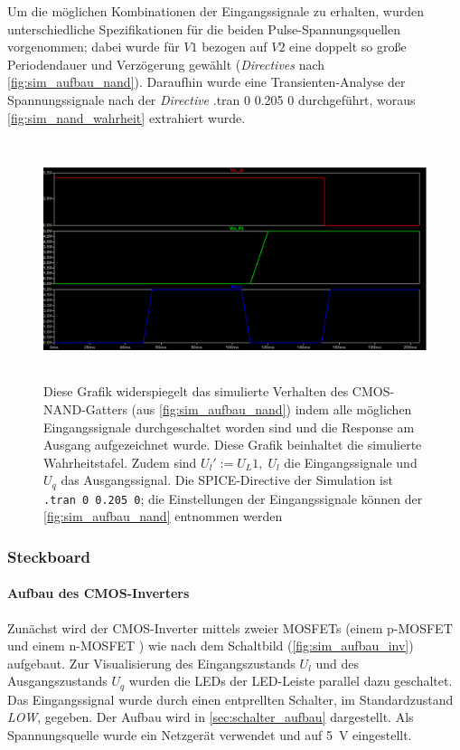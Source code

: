 \documentclass[12pt,english,ngerman]{scrartcl}
\begin{document}
Um die möglichen Kombinationen der Eingangssignale zu erhalten, wurden
unterschiedliche Spezifikationen für die beiden Pulse-Spannungsquellen
vorgenommen; dabei wurde für $V1$ bezogen auf $V2$ eine doppelt so große
Periodendauer und Verzögerung gewählt (\textit{Directives} nach \autoref{fig:sim_aufbau_nand}).
Daraufhin wurde eine Transienten-Analyse der Spannungssignale nach der
\textit{Directive} {.tran 0 0.205 0} durchgeführt, woraus \autoref{fig:sim_nand_wahrheit} extrahiert wurde.
\begin{figure}[H]
  \centering
    \includegraphics[width=\linewidth, height=7cm]{./simdaten_lab/cmos/nand/nand_funktion.png}
  \caption{Diese Grafik widerspiegelt das simulierte Verhalten des CMOS-NAND-Gatters (aus
    \autoref{fig:sim_aufbau_nand}) indem alle möglichen Eingangssignale
    durchgeschaltet worden sind und die Response am Ausgang aufgezeichnet
    wurde. Diese Grafik beinhaltet die simulierte Wahrheitstafel. Zudem sind
    $U_l':=U_L1,\; U_l$ die Eingangssignale und $U_q$ das Ausgangssignal. Die
    SPICE-Directive der Simulation ist \texttt{.tran 0 0.205 0}; die
  Einstellungen der Eingangssignale können der \autoref{fig:sim_aufbau_nand}
  entnommen werden}
  \label{fig:sim_nand_wahrheit}
\end{figure}

\subsubsection{Steckboard}
\paragraph{Aufbau des CMOS-Inverters}\label{sec:mess_cmos}
Zunächst wird der CMOS-Inverter mittels zweier MOSFETs (einem p-MOSFET \cite{ZVP2106A} und
einem n-MOSFET \cite{ZVN2106A}) wie nach dem Schaltbild (\autoref{fig:sim_aufbau_inv})
aufgebaut. Zur Visualisierung des Eingangszustands $U_l$ und des
Ausgangszustands $U_q$ wurden die LEDs der LED-Leiste parallel dazu geschaltet. Das
Eingangssignal wurde durch einen entprellten Schalter, im Standardzustand
\textit{LOW}, gegeben. Der Aufbau wird in \autoref{sec:schalter_aufbau} dargestellt. Als
Spannungsquelle wurde ein Netzgerät verwendet und auf \SI{5}{\volt}
eingestellt. 
\end{document}
